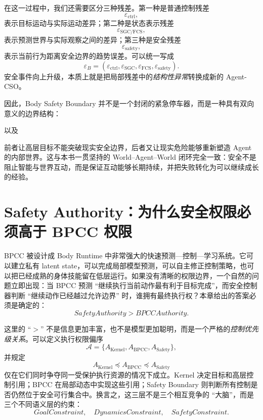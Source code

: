 在这一过程中，我们还需要区分三种残差。第一种是普通控制残差
\[
\varepsilon_{\mathrm{ctrl}},
\]
表示目标运动与实际运动差异；第二种是状态表示残差
\[
\varepsilon_{\mathrm{SGC/FCS}},
\]
表示预测世界与实际观察之间的差异；第三种是安全残差
\[
\varepsilon_{\mathrm{safety}},
\]
表示当前行为距离安全边界的趋势误差。可以统一写成
\[
\varepsilon_B
=
(
\varepsilon_{\mathrm{ctrl}},
\varepsilon_{\mathrm{SGC}},
\varepsilon_{\mathrm{FCS}},
\varepsilon_{\mathrm{safety}}
).
\]
安全事件向上升级，本质上就是把局部残差中的\emph{结构性异常}转换成新的 Agent-CSO。

因此，Body Safety Boundary 并不是一个封闭的紧急停车器，而是一种具有双向意义的边界结构：
\begin{statementbox}
\centering
{}
\end{statementbox}
以及
\begin{statementbox}
\centering
{}
\end{statementbox}
前者让高层目标不能突破现实安全边界，后者又让现实危险能够重新塑造 Agent 的内部世界。这与本书一贯坚持的 World--Agent--World 闭环完全一致：安全不是阻止智能与世界互动，而是保证互动能够长期持续，并把失败转化为可以继续成长的经验。

\section{Safety Authority：为什么安全权限必须高于 BPCC 权限}

BPCC 被设计成 Body Runtime 中非常强大的快速预测—控制—学习系统。它可以建立私有 latent state，可以完成局部模型预测，可以自主修正控制策略，也可以把已经成熟的身体技能留在低层运行。如果没有清晰的权限边界，一个自然的问题立即出现：当 BPCC 预测 ``继续执行当前动作最有利于目标完成''，而安全控制器判断 ``继续动作已经越过允许边界'' 时，谁拥有最终执行权？本章给出的答案必须是确定的：
\[
\boxed{
SafetyAuthority
>
BPCCAuthority.
}
\]

这里的 ``$>$'' 不是信息更加丰富，也不是模型更加聪明，而是一个严格的\emph{控制优先级关系}。可以定义执行权限偏序
\[
\mathcal A
=
\{
A_{\mathrm{Kernel}},
A_{\mathrm{BPCC}},
A_{\mathrm{Safety}}
\},
\]
并规定
\[
A_{\mathrm{Kernel}}
\preceq
A_{\mathrm{BPCC}}
\preceq
A_{\mathrm{Safety}}
\]
仅在它们同时争夺同一受保护执行资源的情况下成立。Kernel 决定目标和高层控制引用；BPCC 在局部动态中实现这些引用；Safety Boundary 则判断所有控制是否仍然位于安全可行集合中。换言之，这三层不是三个相互竞争的 ``大脑''，而是三个不同语义层的约束：
\[
GoalConstraint,
\quad
DynamicsConstraint,
\quad
SafetyConstraint.
\]

